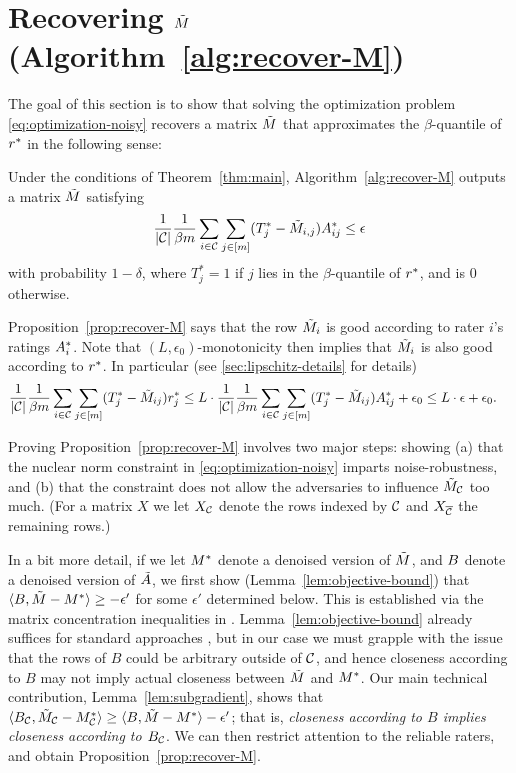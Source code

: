 \section{Recovering $\tilde{M}$ (Algorithm~\ref{alg:recover-M})}
\label{sec:approach-M}

The goal of this section is to show that solving the optimization 
problem \eqref{eq:optimization-noisy} recovers a matrix $\tilde{M}$ that 
approximates the $\beta$-quantile of $r^*$ in the following sense:
\begin{proposition}
\label{prop:recover-M}
Under the conditions of Theorem~\ref{thm:main}, Algorithm~\ref{alg:recover-M} 
outputs a matrix $\tilde{M}$ satisfying 
\[ \frac{1}{|\mathcal{C}|} \frac{1}{\beta m} \sum_{i \in \mathcal{C}} \sum_{j \in [m]} (T^*_j - \tilde{M}_{i,j})A^*_{ij} \leq \epsilon \]
with probability $1-\delta$, where $T^*_j = 1$ if $j$ lies in the $\beta$-quantile of $r^*$, and is $0$ otherwise.
\end{proposition}
Proposition~\ref{prop:recover-M} says that the row $\tilde{M}_i$ 
is good according to rater $i$'s ratings $A^*_i$. Note that
$(L,\epsilon_0)$-monotonicity 
then implies that $\tilde{M}_i$ is also good according to $r^*$.
In particular (see \ref{sec:lipschitz-details} for details)
\begin{align}
\label{eq:lipschitz-usage}
\frac{1}{|\mathcal{C}|}\frac{1}{\beta m}\sum_{i \in \mathcal{C}}\sum_{j \in [m]} (T_j^*-\tilde{M}_{ij})r^*_j
&\leq L \cdot \frac{1}{|\mathcal{C}|}\frac{1}{\beta m}\sum_{i \in \mathcal{C}}\sum_{j \in [m]} (T_j^*-\tilde{M}_{ij})A^*_{ij} + \epsilon_0 
\leq L \cdot \epsilon + \epsilon_0.
\end{align}

Proving Proposition~\ref{prop:recover-M} involves two major steps: showing 
(a) that the nuclear norm constraint in \eqref{eq:optimization-noisy} 
imparts noise-robustness, and (b) that the constraint does not allow 
the adversaries to influence $\tilde{M}_{\mathcal{C}}$ too much. (For a matrix $X$ 
we let $X_{\mathcal{C}}$ denote the rows indexed by $\mathcal{C}$ and $X_{\overline{\mathcal{C}}}$ the remaining rows.)

In a bit 
more detail, if we let $M^*$ denote a denoised version of $\tilde{M}$, and $B$ 
denote a denoised version of $\tilde{A}$, we first show 
(Lemma~\ref{lem:objective-bound}) that 
$\langle B, \tilde{M} - M^* \rangle \geq -\epsilon'$ for some $\epsilon'$ 
determined below. This is established via the matrix concentration 
inequalities in . Lemma~\ref{lem:objective-bound} already 
suffices for standard approaches , 
but in our case we must grapple with the issue that the rows of $B$ could be 
arbitrary outside of $\mathcal{C}$, and hence closeness according to $B$ may not 
imply actual closeness between $\tilde{M}$ and $M^*$. Our main 
technical contribution, Lemma~\ref{lem:subgradient}, shows
that $\langle B_{\mathcal{C}}, \tilde{M}_{\mathcal{C}} - M^*_{\mathcal{C}} \rangle \geq \langle B, \tilde{M} - M^* \rangle - \epsilon'$; 
that is, \emph{closeness according to $B$ implies closeness according to 
$B_{\mathcal{C}}$}. We can then restrict attention to the 
reliable raters, and obtain Proposition~\ref{prop:recover-M}.

